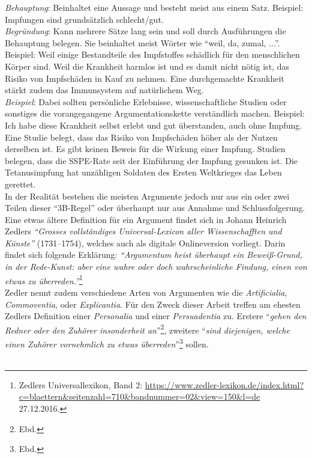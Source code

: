 \documentclass[
    a4paper,
    12pt,
    hyphens,
    chapterprefix=true,
    headheight=33pt,
    footheight=29pt,
    headings=optiontohead, %
]{scrartcl}
\begin{document}
\textit{Behauptung}: Beinhaltet eine Aussage und besteht meist aus einem Satz. Beispiel: Impfungen sind grundsätzlich schlecht/gut.
\\
\textit{Begründung}: Kann mehrere Sätze lang sein und soll durch Ausführungen die Behauptung belegen. Sie beinhaltet meist Wörter wie "`weil, da, zumal, ..."'. Beispiel: Weil einige Bestandteile des Impfstoffes schädlich für den menschlichen Körper sind. Weil die Krankheit harmlos ist und es damit nicht nötig ist, das Risiko von Impfschäden in Kauf zu nehmen. Eine durchgemachte Krankheit stärkt zudem das Immunsystem auf natürlichem Weg.
\\
\textit{Beispiel}: Dabei sollten persönliche Erlebnisse, wissenschaftliche Studien oder sonstiges die vorangegangene Argumentationskette verständlich machen. Beispiel: Ich habe diese Krankheit selbst erlebt und gut überstanden, auch ohne Impfung. Eine Studie belegt, dass das Risiko von Impfschäden höher als der Nutzen derselben ist. Es gibt keinen Beweis für die Wirkung einer Impfung. Studien belegen, dass die SSPE-Rate seit der Einführung der Impfung gesunken ist. Die Tetanusimpfung hat unzähligen Soldaten des Ersten Weltkrieges das Leben gerettet.
\\
In der Realität bestehen die meisten Argumente jedoch nur aus ein oder zwei Teilen dieser "`3B-Regel"' oder überhaupt nur aus Annahme und Schlussfolgerung.\\
Eine etwas ältere Definition für ein Argument findet sich in Johann Heinrich Zedlers \textit{"`Grosses vollständiges Universal-Lexicon aller Wissenschafften und Künste"'}  (1731--1754), welches auch als digitale Onlineversion vorliegt. Darin findet sich folgende Erklärung: \textit{"`Argumentum heist überhaupt ein Beweiß-Grund, in der Rede-Kunst: aber eine wahre oder doch wahrscheinliche Findung, einen von etwas zu überreden."'}\footnote{Zedlers Universallexikon, Band 2: \url{https://www.zedler-lexikon.de/index.html?c=blaettern&seitenzahl=710&bandnummer=02&view=150&l=de} 27.12.2016.}\\
Zedler nennt zudem verschiedene Arten von Argumenten wie die \textit{Artificialia}, \textit{Commoventia}, oder \textit{Explicantia}. Für den Zweck dieser Arbeit treffen am ehesten Zedlers Definition einer \textit{Personalia} und einer \textit{Persuadentia} zu. Erstere "`\textit{gehen den Redner oder den Zuhörer insonderheit an}"'\footnote{Ebd.}, zweitere "`\textit{sind diejenigen, welche einen Zuhörer vornehmlich zu etwas überreden}"'\footnote{Ebd.} sollen.\\
\\
\end{document}

